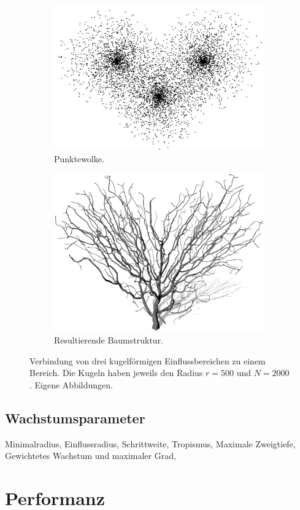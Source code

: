  \begin{figure} [hbtp]
 	\centering
 	\begin{subfigure}[t]{.45\textwidth}
 		\centering
 		\includegraphics[width=\linewidth]{images/SCA_MultipleSpheres_Points.png}
 		\caption{Punktewolke.}
 		\label{subfig:SCA_MultipleSpheres_Points}
 	\end{subfigure}
 	\hspace{.05\linewidth}
 	\begin{subfigure}[t]{.45\textwidth}
 		\centering
 		\includegraphics[width=\linewidth]{images/SCA_MultipleSpheres_Grown.png}
 		\caption{Resultierende Baumstruktur.}
 		\label{subfig:SCA_MultipleSpheres_Grown}
 	\end{subfigure}	
 	\caption{Verbindung von drei kugelförmigen Einflussbereichen zu einem Bereich. Die Kugeln haben jeweils den Radius $r=500$ und $N=2000$. Eigene Abbildungen.}
 	\label{fig:SCA_MultipleSpheres}
 \end{figure}
 
\subsection{Wachstumsparameter}

Minimalradius, Einflussradius, Schrittweite, Tropismus, Maximale Zweigtiefe, Gewichtetes Wachstum und maximaler Grad,

\section{Performanz}



